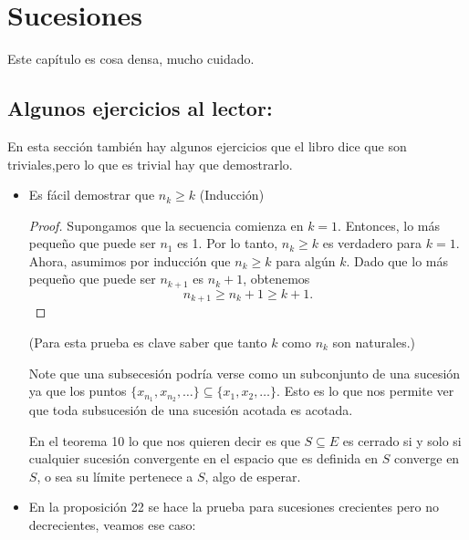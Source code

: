 \section{Sucesiones}

Este capítulo es cosa densa, mucho cuidado.

\subsection{Algunos ejercicios al lector:}

En esta sección también hay algunos ejercicios que el libro dice que son triviales,pero lo que es trivial hay que demostrarlo.

\begin{itemize}[leftmargin=*]

\item Es fácil demostrar que $n_k\geq k$ (Inducción)\\

\begin{proof}
Supongamos que la secuencia comienza en $k=1$. Entonces, lo más pequeño que puede ser $n_1$ es 1. Por lo tanto, $n_k \geq k$ es verdadero para $k=1$. Ahora, asumimos por inducción que $n_k \geq k$ para algún $k$. Dado que lo más pequeño que puede ser $n_{k+1}$ es $n_k+1$, obtenemos
$$
n_{k+1} \geq n_k+1 \geq k+1.
$$
\end{proof}

(Para esta prueba es clave saber que tanto $k$ como $n_k$ son naturales.)

\begin{note}
Note que una subsecesión podría verse como un subconjunto de una sucesión ya que los puntos $\{x_{n_1},x_{n_2},\ldots\}\subseteq\{x_1,x_2,\ldots\}$. Esto es lo que nos permite ver que toda subsucesión de una sucesión acotada es acotada.


\end{note}

\begin{note}
En el teorema 10 lo que nos quieren decir es que $S\subseteq E$ es cerrado si y solo si cualquier sucesión convergente en el espacio que es definida en $S$ converge en $S$, o sea su límite pertenece a $S$, algo de esperar.
\end{note}


\item En la proposición 22 se hace la prueba para sucesiones crecientes pero no decrecientes, veamos ese caso:\\


\end{itemize}
